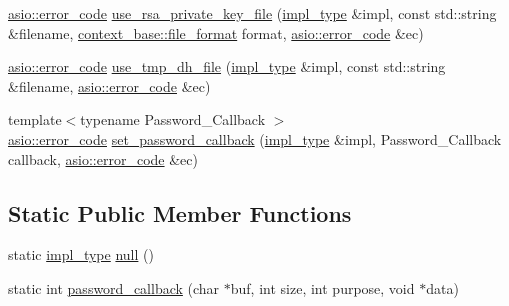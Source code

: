 \begin{DoxyCompactItemize}
\item 
\hyperlink{classasio_1_1error__code}{asio\+::error\+\_\+code} \hyperlink{classasio_1_1ssl_1_1old_1_1detail_1_1openssl__context__service_ac023706ba2ce9bb183b8b52d97b8d0b7}{use\+\_\+rsa\+\_\+private\+\_\+key\+\_\+file} (\hyperlink{classasio_1_1ssl_1_1old_1_1detail_1_1openssl__context__service_a1287914e0f48a9098c9141ca33ecd570}{impl\+\_\+type} \&impl, const std\+::string \&filename, \hyperlink{classasio_1_1ssl_1_1context__base_acc846aa73fffcab1fecad36dcf2be1fb}{context\+\_\+base\+::file\+\_\+format} format, \hyperlink{classasio_1_1error__code}{asio\+::error\+\_\+code} \&ec)
\item 
\hyperlink{classasio_1_1error__code}{asio\+::error\+\_\+code} \hyperlink{classasio_1_1ssl_1_1old_1_1detail_1_1openssl__context__service_a37afa96a80ee1bdf793caaff9ee3de13}{use\+\_\+tmp\+\_\+dh\+\_\+file} (\hyperlink{classasio_1_1ssl_1_1old_1_1detail_1_1openssl__context__service_a1287914e0f48a9098c9141ca33ecd570}{impl\+\_\+type} \&impl, const std\+::string \&filename, \hyperlink{classasio_1_1error__code}{asio\+::error\+\_\+code} \&ec)
\item 
{\footnotesize template$<$typename Password\+\_\+\+Callback $>$ }\\\hyperlink{classasio_1_1error__code}{asio\+::error\+\_\+code} \hyperlink{classasio_1_1ssl_1_1old_1_1detail_1_1openssl__context__service_a1a44f18bf5817c3b299e218f595c35dc}{set\+\_\+password\+\_\+callback} (\hyperlink{classasio_1_1ssl_1_1old_1_1detail_1_1openssl__context__service_a1287914e0f48a9098c9141ca33ecd570}{impl\+\_\+type} \&impl, Password\+\_\+\+Callback callback, \hyperlink{classasio_1_1error__code}{asio\+::error\+\_\+code} \&ec)
\end{DoxyCompactItemize}
\subsection*{Static Public Member Functions}
\begin{DoxyCompactItemize}
\item 
static \hyperlink{classasio_1_1ssl_1_1old_1_1detail_1_1openssl__context__service_a1287914e0f48a9098c9141ca33ecd570}{impl\+\_\+type} \hyperlink{classasio_1_1ssl_1_1old_1_1detail_1_1openssl__context__service_a4d2ed58a1dcebb93c0bd86e5a07d38e8}{null} ()
\item 
static int \hyperlink{classasio_1_1ssl_1_1old_1_1detail_1_1openssl__context__service_a40e0e16f38d916daad1598adf8e92175}{password\+\_\+callback} (char $\ast$buf, int size, int purpose, void $\ast$data)
\end{DoxyCompactItemize}
